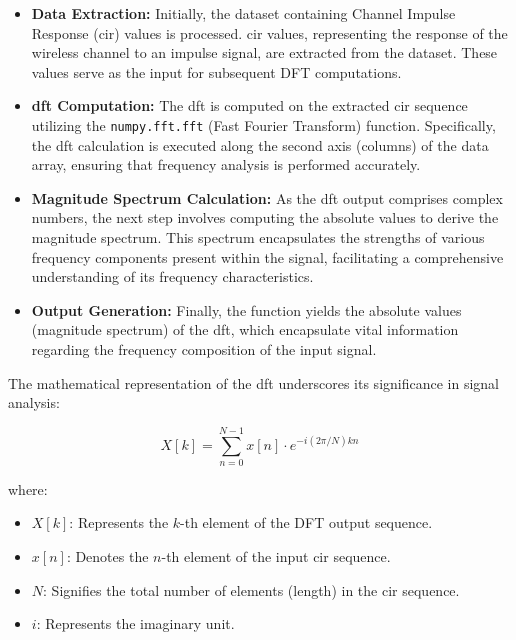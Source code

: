 \begin{itemize}
    \item \textbf{Data Extraction:} Initially, the dataset containing Channel Impulse Response (\acrshort{cir}) values is processed. \acrshort{cir} values, representing the response of the wireless channel to an impulse signal, are extracted from the dataset. These values serve as the input for subsequent DFT computations.
    
    \item \textbf{\acrshort{dft} Computation:} The \acrshort{dft} is computed on the extracted \acrshort{cir} sequence utilizing the \texttt{numpy.fft.fft} (Fast Fourier Transform) function. Specifically, the \acrshort{dft} calculation is executed along the second axis (columns) of the data array, ensuring that frequency analysis is performed accurately.
    
    \item \textbf{Magnitude Spectrum Calculation:} As the \acrshort{dft} output comprises complex numbers, the next step involves computing the absolute values to derive the magnitude spectrum. This spectrum encapsulates the strengths of various frequency components present within the signal, facilitating a comprehensive understanding of its frequency characteristics.
    
    \item \textbf{Output Generation:} Finally, the function yields the absolute values (magnitude spectrum) of the \acrshort{dft}, which encapsulate vital information regarding the frequency composition of the input signal.
\end{itemize}

The mathematical representation of the \acrshort{dft} underscores its significance in signal analysis:

\begin{equation}
X[k] = \sum_{n=0}^{N-1} x[n] \cdot e^{-i(2\pi/N)kn}
\end{equation}

where:
\begin{itemize}
    \item $X[k]$: Represents the $k$-th element of the DFT output sequence.
    \item $x[n]$: Denotes the $n$-th element of the input \acrshort{cir} sequence.
    \item $N$: Signifies the total number of elements (length) in the \acrshort{cir} sequence.
    \item $i$: Represents the imaginary unit.
\end{itemize}

